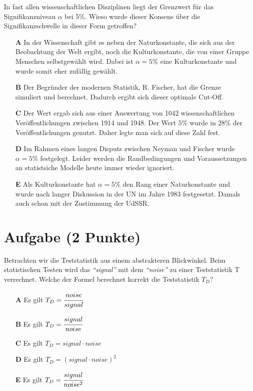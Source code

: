 \documentclass[a4paper, 9pt]{scrartcl}\usepackage[]{graphicx}\usepackage[]{xcolor}
\begin{document}
In fast allen wissenschaftlichen Disziplinen liegt der Grenzwert für das Signifikanzniveau $\alpha$ bei 5\%. Wieso wurde dieser Konsens über die Signifikanzschwelle in dieser Form getroffen?



\begin{enumerate}
\item [\textbf{A} \msquare] In der Wissenschaft gibt es neben der Naturkonstante, die sich aus der Beobachtung der Welt ergibt, noch die Kulturkonstante, die von einer Gruppe Menschen selbstgewählt wird. Dabei ist $\alpha = 5\%$ eine Kulturkonstante und wurde somit eher zufällig gewählt.
\item [\textbf{B} \msquare] Der Begründer der modernen Statistik, R. Fischer, hat die Grenze simuliert und berechnet. Dadurch ergibt sich dieser optimale Cut-Off.
\item [\textbf{C} \msquare] Der Wert ergab sich aus einer Auswertung von 1042 wissenschaftlichen Veröffentlichungen zwischen 1914 und 1948. Der Wert $5\%$ wurde in $28\%$ der Veröffentlichungen genutzt. Daher legte man sich auf diese Zahl fest.
\item [\textbf{D} \msquare] Im Rahmen eines langen Disputs zwischen Neyman und Fischer wurde $\alpha = 5\%$ festgelegt. Leider werden die Randbedingungen und Voraussetzungen an statistsiche Modelle heute immer wieder ignoriert.
\item [\textbf{E} \msquare] Als Kulturkonstante hat $\alpha = 5\%$ den Rang einer Naturkonstante und wurde nach langer Diskussion in der UN im Jahre 1983 festgesetzt. Damals auch schon mit der Zustimmung der UdSSR.
\end{enumerate}

\section{Aufgabe \hfill (2 Punkte)}

Betrachten wir die Teststatistik aus einem abstrakteren Blickwinkel. Beim
statistischen Testen wird das \textit{"`signal"'} mit dem
\textit{"`noise"'} zu einer Teststatistik T verrechnet. Welche der Formel
berechnet korrekt die Teststatistik $T_D$?



\begin{enumerate}
\item [\textbf{A} \msquare] Es gilt $T_D = \cfrac{noise}{signal}$
\item [\textbf{B} \msquare] Es gilt $T_D = \cfrac{signal}{noise}$
\item [\textbf{C} \msquare] Es gilt $T_D = signal \cdot noise$
\item [\textbf{D} \msquare] Es gilt $T_D = (signal \cdot noise)^2$
\item [\textbf{E} \msquare] Es gilt $T_D = \cfrac{signal}{noise^2}$
\end{enumerate}
\end{document}
